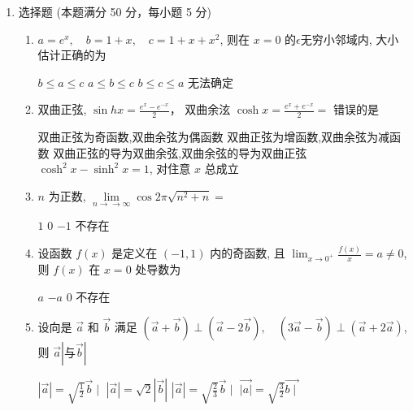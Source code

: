 


\begin{enumerate}
	\item
	选择题 (本题满分 50 分，每小题 5 分)
\begin{enumerate}
	\item
	$a=e^{x}, \quad b=1+x, \quad c=1+x+x^{2}$, 则在 $x=0$ 的$ \epsilon $无穷小邻域内, 大小估计正确的为  
	
\fourchoices
{$ b \leq a \leq c$}
{$a \leq b \leq c$}
{$b \leq c \leq a$}
{无法确定}

\item 
双曲正弦, $\sin h x=\frac{e^{x}-e^{-x}}{2} $， 双曲余泫 $\cosh x=\frac{e^{x}+e^{-x}}{2}=$ 错误的是	  


\fourchoices
{双曲正弦为奇函数,双曲余弦为偶函数}
{双曲正弦为增函数,双曲余弦为减函数}
{双曲正弦的导为双曲余弦,双曲余弦的导为双曲正弦}
{$\cosh ^{2} x-\sinh ^{2} x=1$, 对住意 $x$ 总成立}

\item 
$n$ 为正数, $\lim\limits _{n \rightarrow \rightarrow \infty} \cos 2 \pi \sqrt{n^{2}+n}=$  

\fourchoices
{$ 1 $}
{$ 0 $}
{$-1$}
{不存在}

\item 
设函数 $f(x)$ 是定义在 $(-1,1)$ 内的奇函数, 且 $\lim _{x \rightarrow 0^{+}} \frac{f(x)}{x}=a \neq 0$, 则 $f(x)$ 在 $x=0$ 处导数为  

\fourchoices
{$a$}
{$-a$}
{$ 0 $}
{不存在}

\item 
设向是 $\vec{a}$ 和 $\vec{b}$ 满足 $(\vec{a}+\vec{b}) \perp(\vec{a}-2 \vec{b}), \quad(3 \vec{a}-\vec{b}) \perp(\vec{a}+2 \vec{a})$, 则 $\vec{a}|与 \vec{b}|$  

\fourchoices
{$|\vec{a}|=\sqrt{\frac{1}{2}} \vec{b} \mid$}
{$|\vec{a}|=\sqrt{2}|\vec{b}|$}
{$|\vec{a}|=\sqrt{\frac{2}{3}} \vec{b} \mid$}
{$\overrightarrow{|a|}=\sqrt{\frac{3}{2}} \overrightarrow{b \mid}$}


\end{enumerate}
\end{enumerate}
